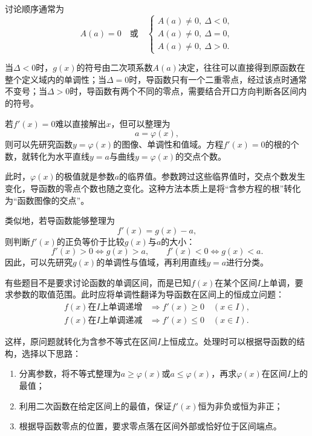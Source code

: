 讨论顺序通常为
\[
\boxed{
A(a)=0
\quad\text{或}\quad
\begin{cases}
A(a)\neq0,\ \Delta<0,\\
A(a)\neq0,\ \Delta=0,\\
A(a)\neq0,\ \Delta>0.
\end{cases}
}
\]

当$\Delta<0$时，$g(x)$的符号由二次项系数$A(a)$决定，往往可以直接得到原函数在整个定义域内的单调性；当$\Delta=0$时，导函数只有一个二重零点，经过该点时通常不变号；当$\Delta>0$时，导函数有两个不同的零点，需要结合开口方向判断各区间内的符号。

\medskip
{}

若$f'(x)=0$难以直接解出$x$，但可以整理为
\[
a=\varphi(x),
\]
则可以先研究函数$y=\varphi(x)$的图像、单调性和值域。方程$f'(x)=0$的根的个数，就转化为水平直线$y=a$与曲线$y=\varphi(x)$的交点个数。

此时，$\varphi(x)$的极值就是参数$a$的临界值。参数跨过这些临界值时，交点个数发生变化，导函数的零点个数也随之变化。这种方法本质上是将“含参方程的根”转化为“函数图像的交点”。

类似地，若导函数能够整理为
\[
f'(x)=g(x)-a,
\]
则判断$f'(x)$的正负等价于比较$g(x)$与$a$的大小：
\[
f'(x)>0\Longleftrightarrow g(x)>a,
\qquad
f'(x)<0\Longleftrightarrow g(x)<a.
\]
因此，可以先研究$g(x)$的单调性与值域，再利用直线$y=a$进行分类。

\medskip
{}

有些题目不是要求讨论函数的单调区间，而是已知$f(x)$在某个区间$I$上单调，要求参数的取值范围。此时应将单调性翻译为导函数在区间上的恒成立问题：
\[
\begin{aligned}
f(x)\text{在$I$上单调递增}
&\Longrightarrow f'(x)\geqslant0\quad(x\in I),\\
f(x)\text{在$I$上单调递减}
&\Longrightarrow f'(x)\leqslant0\quad(x\in I).
\end{aligned}
\]

这样，原问题就转化为含参不等式在区间$I$上恒成立。处理时可以根据导函数的结构，选择以下思路：

\begin{enumerate}
  \item 分离参数，将不等式整理为$a\geqslant\varphi(x)$或$a\leqslant\varphi(x)$，再求$\varphi(x)$在区间$I$上的最值；
  \item 利用二次函数在给定区间上的最值，保证$f'(x)$恒为非负或恒为非正；
  \item 根据导函数零点的位置，要求零点落在区间外部或恰好位于区间端点。
\end{enumerate}

